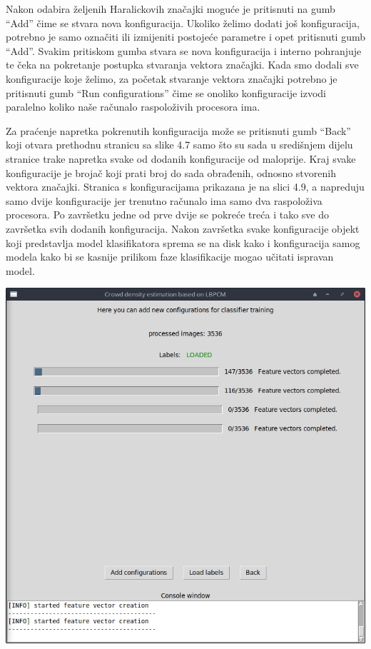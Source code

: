 \documentclass[times, utf8, zavrsni, numeric]{fer}
\begin{document}
\bigbreak

Nakon odabira željenih Haralickovih
značajki moguće je pritisnuti na gumb \enquote{Add} čime se stvara
nova konfiguracija. Ukoliko želimo dodati još konfiguracija, potrebno je samo
označiti ili izmijeniti postojeće parametre i opet pritisnuti gumb \enquote{Add}.
Svakim pritiskom gumba stvara se nova konfiguracija i interno pohranjuje te čeka na
pokretanje postupka stvaranja vektora značajki. Kada smo dodali sve konfiguracije
koje želimo, za početak stvaranje vektora značajki potrebno je pritisnuti gumb
\enquote{Run configurations} čime se onoliko konfiguracije izvodi paralelno koliko
naše računalo raspoloživih procesora ima. 

\bigbreak

Za praćenje napretka pokrenutih konfiguracija može se pritisnuti gumb 
\enquote{Back} koji otvara prethodnu stranicu sa slike 4.7 samo što su sada
u središnjem dijelu stranice trake napretka svake od dodanih konfiguracije od maloprije. 
Kraj svake konfiguracije je brojač koji prati broj do sada obrađenih, odnosno
stvorenih vektora značajki. Stranica s konfiguracijama prikazana je na slici 4.9, a 
napreduju samo dvije konfiguracije jer trenutno računalo ima samo dva raspoloživa procesora.
Po završetku jedne od prve dvije se pokreće treća i tako sve do završetka svih 
dodanih konfiguracija. Nakon završetka svake konfiguracije objekt koji predstavlja 
model klasifikatora sprema se na disk kako i konfiguracija samog modela kako
bi se kasnije prilikom faze klasifikacije mogao učitati ispravan model.

\bigbreak

\begin{minipage}{\linewidth}
\centering
\includegraphics[scale=0.4]{img/fvc3.png}
\end{minipage}
\end{document}
